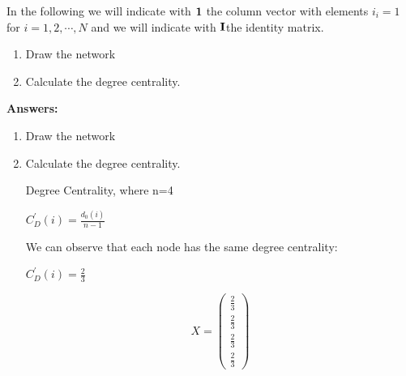 \documentclass{amsart}
\theoremstyle{definition}
\theoremstyle{remark}
\numberwithin{equation}{section}
\begin{document}
\begin{enumerate}
\vspace{0.2cm}
In the following we will indicate with ${\bf 1}$ the column vector with elements $i_i = 1$ for $i = 1, 2, \cdots, N$ and we will indicate with ${\bf I}$the identity matrix. \vspace{0.2cm}
\begin{enumerate}
\item Draw the network
\item Calculate the degree centrality.
\end{enumerate}
\vspace{1cm}

\textbf{Answers:}

\begin{enumerate}
\item Draw the network \vspace{0.2cm}


\vspace{0.2cm}
\item Calculate the degree centrality. \vspace{0.2cm}

Degree Centrality, where n=4 \vspace{0.2cm}

$C_{D}^{'}(i) = \frac{d_{0}(i)}{n-1}$

\vspace{0.2cm}

We can observe that each node has the same degree centrality: \vspace{0.2cm}

$C_{D}^{'}(i) = \frac{2}{3}$ \vspace{0.2cm}

\begin{equation*}
    {X}  = 
    \begin{pmatrix} 
        \frac{2}{3} \\ 
        \frac{2}{3} \\ 
        \frac{2}{3} \\ 
        \frac{2}{3}
    \end{pmatrix}
\end{equation*} \vspace{0.2cm}


\end{enumerate}
\end{enumerate}
\end{document}
